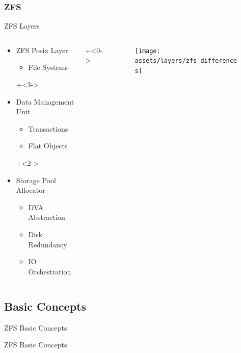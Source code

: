 \subsubsection{ZFS}
\begin{frame}[label=overview_zfs_stack]{ZFS Layers}
	\begin{columns}[c]
		\begin{column}{0.4\textwidth}
			\pause
			\begin{itemize}
				\onslide+<4->
				\item ZFS Posix Layer
				\begin{itemize}
					\item File Systems
				\end{itemize}
				\onslide+<3->	
				\item Data Management Unit
					\begin{itemize}
						\item Transactions
						\item Flat Objects
					\end{itemize}
				\onslide+<2->
				\item Storage Pool Allocator
				\begin{itemize}
					\item \small DVA Abstraction %
					\item \small Disk Redundancy
					\item \small IO Orchestration
				\end{itemize}
			\end{itemize}
		\end{column}
			\onslide+<0->
			\begin{column}{0.4\textwidth}
				\begin{figure}
					\centering
					\texttt{[image: assets/layers/zfs\_differences]}
				\end{figure}
			\end{column}
	\end{columns}
\end{frame}

\subsection{Basic Concepts}
\begin{frame}{ZFS Basic Concepts}
	\begin{center}
		\Huge ZFS Basic Concepts
	\end{center}	
\end{frame}



